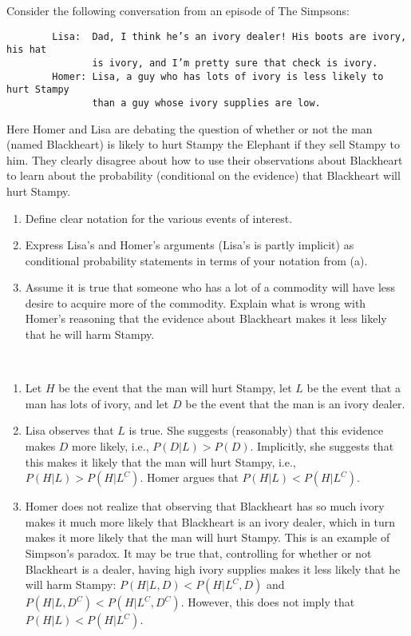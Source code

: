

\setcounter{theorem}{21}
\begin{exercise}[BH.2.56] 
  Consider the following conversation from an episode of The Simpsons:
	
	\begin{verbatim}
		Lisa:  Dad, I think he’s an ivory dealer! His boots are ivory, his hat
		       is ivory, and I’m pretty sure that check is ivory.
		Homer: Lisa, a guy who has lots of ivory is less likely to hurt Stampy 
		       than a guy whose ivory supplies are low.
	\end{verbatim}

	Here Homer and Lisa are debating the question of whether or not the man (named Blackheart) is likely to hurt Stampy the Elephant if they sell Stampy to him. They clearly disagree about how to use their observations about Blackheart to learn about the probability (conditional on the evidence) that Blackheart will hurt Stampy.
	\begin{enumerate}
		\item Define clear notation for the various events of interest.
		\item Express Lisa's and Homer's arguments (Lisa's is partly implicit) as conditional probability statements in terms of your notation from (a).
		\item Assume it is true that someone who has a lot of a commodity will have less desire to acquire more of the commodity. Explain what is wrong with Homer's reasoning that the evidence about Blackheart makes it less likely that he will harm Stampy.
	\end{enumerate}
\begin{solution}~
	\begin{enumerate}
		\item Let $H$ be the event that the man will hurt Stampy, let $L$ be the event that a man has lots of ivory, and let $D$ be the event that the man is an ivory dealer.
		\item Lisa observes that $L$ is true. She suggests (reasonably) that this evidence makes $D$ more likely, i.e., $P(D|L) > P(D)$. Implicitly, she suggests that this makes it likely that the man will hurt Stampy, i.e., $P(H|L) > P(H|L^C)$. Homer argues that $P(H|L) < P(H|L^C)$.
		\item Homer does not realize that observing that Blackheart has so much ivory makes it much more likely that Blackheart is an ivory dealer, which in turn makes it more likely that the man will hurt Stampy. This is an example of Simpson’s paradox. It may be true that, controlling for whether or not Blackheart is a dealer, having high ivory supplies makes it less likely that he will harm Stampy: $P(H|L, D) < P(H|L^C,D)$ and $P(H|L, D^C) < P(H|L^C,D^C)$. However, this does not imply that $P(H|L) < P(H|L^{C})$.
	\end{enumerate}
\end{solution}
\end{exercise}

